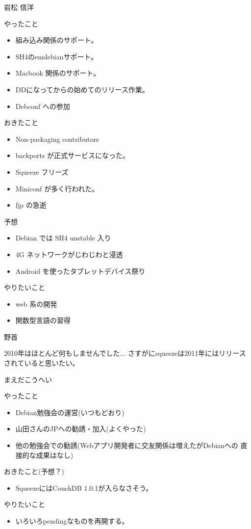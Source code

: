 \begin{prework}{ 岩松 信洋 }

やったこと
\begin{itemize}
 \item 組み込み関係のサポート。
 \item SH4のemdebianサポート。
 \item Macbook 関係のサポート。
 \item DDになってからの始めてのリリース作業。
 \item Debconf への参加
\end{itemize}
おきたこと
\begin{itemize}
 \item Non-packaging contributors
 \item backports が正式サービスになった。 
 \item Squeeze フリーズ
 \item Miniconf が多く行われた。
 \item fjp の急逝
\end{itemize}
予想
\begin{itemize}
 \item Debian では SH4 unstable 入り
 \item 4G ネットワークがじわじわと浸透
 \item Android を使ったタブレットデバイス祭り
\end{itemize}
やりたいこと
\begin{itemize}
 \item web 系の開発
 \item 関数型言語の習得
\end{itemize}
\end{prework}

\begin{prework}{ 野首 }

2010年はほとんど何もしませんでした...
さすがにsqueezeは2011年にはリリースされていると思いたい。
\end{prework}

\begin{prework}{ まえだこうへい }

やったこと
\begin{itemize}
 \item Debian勉強会の運営(いつもどおり)
 \item 山田さんのJPへの勧誘・加入(よくやった)
 \item 他の勉強会での勧誘(Webアプリ開発者に交友関係は増えたがDebianへの
       直接的な成果はなし)
\end{itemize}
おきたこと(予想？)
\begin{itemize}
 \item SqueezeにはCouchDB 1.0.1が入らなさそう。
\end{itemize}
やりたいこと
\begin{itemize}
 \item いろいろpendingなものを再開する。
\end{itemize}
\end{prework}

